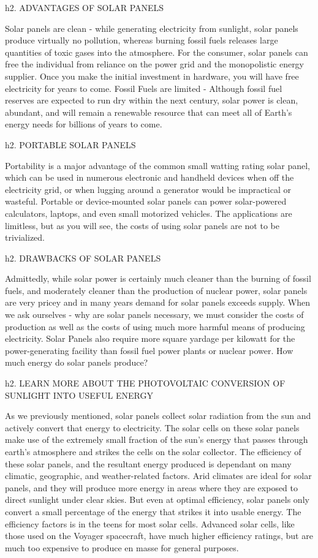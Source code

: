 h2. ADVANTAGES OF SOLAR PANELS

Solar panels are clean - while generating electricity from sunlight, solar panels produce virtually no pollution, whereas burning fossil fuels releases large quantities of toxic gases into the atmosphere. 
For the consumer, solar panels can free the individual from reliance on the power grid and the monopolistic energy supplier. Once you make the initial investment in hardware, you will have free electricity for years to come. 
Fossil Fuels are limited - Although fossil fuel reserves are expected to run dry within the next century, solar power is clean, abundant, and will remain a renewable resource that can meet all of Earth's energy needs for billions of years to come. 

h2. PORTABLE SOLAR PANELS

Portability is a major advantage of the common small watting rating solar panel, which can be used in numerous electronic and handheld devices when off the electricity grid, or when lugging around a generator would be impractical or wasteful. Portable or device-mounted solar panels can power solar-powered calculators, laptops, and even small motorized vehicles. The applications are limitless, but as you will see, the costs of using solar panels are not to be trivialized. 

h2. DRAWBACKS OF SOLAR PANELS

Admittedly, while solar power is certainly much cleaner than the burning of fossil fuels, and moderately cleaner than the production of nuclear power, solar panels are very pricey and in many years demand for solar panels exceeds supply. When we ask ourselves - why are solar panels necessary, we must consider the costs of production as well as the costs of using much more harmful means of producing electricity. Solar Panels also require more square yardage per kilowatt for the power-generating facility than fossil fuel power plants or nuclear power. 
How much energy do solar panels produce?

h2. LEARN MORE ABOUT THE PHOTOVOLTAIC CONVERSION OF SUNLIGHT INTO USEFUL ENERGY

As we previously mentioned, solar panels collect solar radiation from the sun and actively convert that energy to electricity. The solar cells on these solar panels make use of the extremely small fraction of the sun's energy that passes through earth's atmosphere and strikes the cells on the solar collector. The efficiency of these solar panels, and the resultant energy produced is dependant on many climatic, geographic, and weather-related factors. Arid climates are ideal for solar panels, and they will produce more energy in areas where they are exposed to direct sunlight under clear skies. But even at optimal efficiency, solar panels only convert a small percentage of the energy that strikes it into usable energy. The efficiency factors is in the teens for most solar cells. Advanced solar cells, like those used on the Voyager spacecraft, have much higher efficiency ratings, but are much too expensive to produce en masse for general purposes. 

